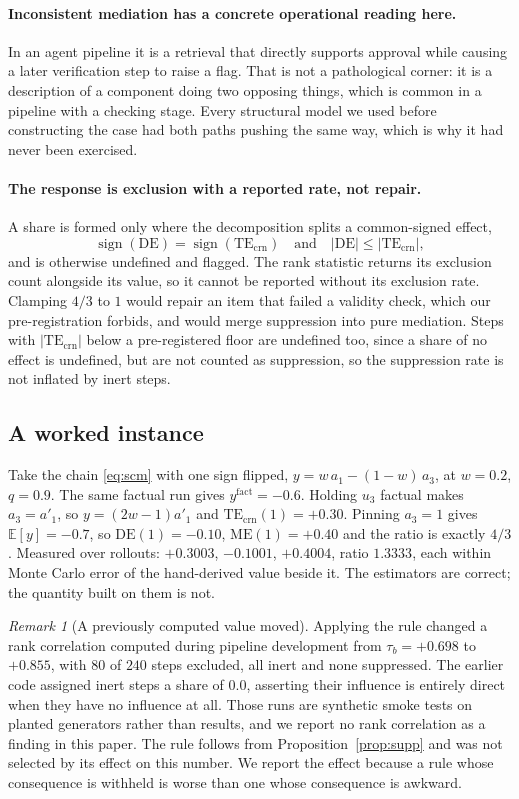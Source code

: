 \documentclass[11pt]{article}
\theoremstyle{remark}
\newtheorem*{remark}{Remark}
\newcommand{\TEcrn}{\mathrm{TE}_{\mathrm{crn}}}
\newcommand{\DE}{\mathrm{DE}}
\newcommand{\ME}{\mathrm{ME}}
\newcommand{\Ex}{\mathbb{E}}
\begin{document}
\paragraph{Inconsistent mediation has a concrete operational reading here.} In
an agent pipeline it is a retrieval that directly supports approval while
causing a later verification step to raise a flag. That is not a pathological
corner: it is a description of a component doing two opposing things, which is
common in a pipeline with a checking stage. Every structural model we used
before constructing the case had both paths pushing the same way, which is why
it had never been exercised.

\paragraph{The response is exclusion with a reported rate, not repair.} A share
is formed only where the decomposition splits a common-signed effect,
\[
  \operatorname{sign}(\DE) = \operatorname{sign}(\TEcrn)
  \quad\text{and}\quad
  |\DE| \le |\TEcrn| ,
\]
and is otherwise undefined and flagged. The rank statistic returns its exclusion
count alongside its value, so it cannot be reported without its exclusion rate.
Clamping $4/3$ to $1$ would repair an item that failed a validity check, which
our pre-registration forbids, and would merge suppression into pure mediation.
Steps with $|\TEcrn|$ below a pre-registered floor are undefined too, since a
share of no effect is undefined, but are not counted as suppression, so the
suppression rate is not inflated by inert steps.

\subsection{A worked instance}

Take the chain \eqref{eq:scm} with one sign flipped, $y = w\,a_1 - (1-w)\,a_3$,
at $w = 0.2$, $q = 0.9$. The same factual run gives
$y^{\mathrm{fact}} = -0.6$. Holding $u_3$ factual makes $a_3 = a'_1$, so
$y = (2w-1)a'_1$ and $\TEcrn(1) = +0.30$. Pinning $a_3 = 1$ gives
$\Ex[y] = -0.7$, so $\DE(1) = -0.10$, $\ME(1) = +0.40$ and the ratio is exactly
$4/3$. Measured over rollouts: $+0.3003$, $-0.1001$, $+0.4004$, ratio $1.3333$,
each within Monte Carlo error of the hand-derived value beside it. The
estimators are correct; the quantity built on them is not.

\begin{remark}[A previously computed value moved]
Applying the rule changed a rank correlation computed during pipeline
development from $\tau_b = +0.698$ to $+0.855$, with $80$ of $240$ steps
excluded, all inert and none suppressed. The earlier code assigned inert steps a
share of $0.0$, asserting their influence is entirely direct when they have no
influence at all. Those runs are synthetic smoke tests on planted generators
rather than results, and we report no rank correlation as a finding in this
paper. The rule follows from Proposition~\ref{prop:supp} and was not selected by
its effect on this number. We report the effect because a rule whose consequence
is withheld is worse than one whose consequence is awkward.
\end{remark}
\end{document}
